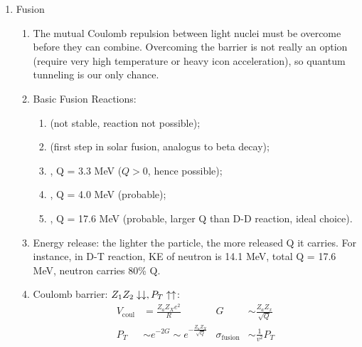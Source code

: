\documentclass{school-22.101-notes}
\begin{document}
\begin{enumerate}
\item Fusion
\begin{enumerate}
\item The mutual Coulomb repulsion between light nuclei must be overcome before they can combine. Overcoming the barrier is not really an option (require very high temperature or heavy icon acceleration), so quantum tunneling is our only chance. 
\item Basic Fusion Reactions: 
\begin{enumerate}
\item {} (not stable, reaction not possible); 
\item {} (first step in solar fusion, analogus to beta decay);
\item {}, Q = 3.3 MeV ($Q>0$, hence possible); 
\item {}, Q = 4.0 MeV (probable);
\item {}, Q = 17.6 MeV (probable, larger Q than D-D reaction, ideal choice).
\end{enumerate}
\item Energy release: the lighter the particle, the more released Q it carries. For instance, in D-T reaction, KE of neutron is 14.1 MeV, total Q = 17.6 MeV, neutron carries 80\% Q.
\item Coulomb barrier: $Z_1 Z_2 \downarrow \downarrow, P_T \uparrow \uparrow$:
\begin{align}
V_{\mathrm{coul}} &= \frac{Z_{a} Z_{X} e^2 }{R} & G &\sim \frac{Z_a Z_x}{\sqrt{Q}} \\
P_T &\sim e^{-2G} \sim e^{- \frac{Z_a Z_X}{\sqrt{Q}}} & \sigma_{\mathrm{fusion}} &\sim \frac{1}{v^2} P_T
\end{align}
\end{enumerate}
\end{enumerate}
\end{document}
